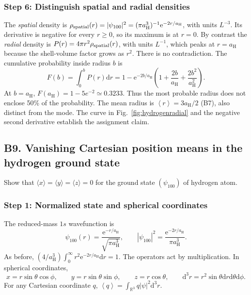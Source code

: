 \documentclass[11pt,a4paper]{article}
\newcommand{\dd}{\mathrm{d}}
\newcommand{\ee}{\mathrm{e}}
\newcommand{\avg}[1]{\left\langle #1\right\rangle}
\newcommand{\R}{\mathbb R}
\newcommand{\aH}{a_{\mathrm H}}
\begin{document}
\subsubsection*{Step 6: Distinguish spatial and radial densities}
The \emph{spatial} density is \(\rho_{\rm spatial}(r)=|\psi_{100}|^2=(\pi\aH^3)^{-1}\ee^{-2r/\aH}\), with units \(L^{-3}\). Its derivative is negative for every \(r\ge0\), so its maximum is at \(r=0\). By contrast the \emph{radial} density is \(P(r)=4\pi r^2\rho_{\rm spatial}(r)\), with units \(L^{-1}\), which peaks at \(r=\aH\) because the shell-volume factor grows as \(r^2\). There is no contradiction. The cumulative probability inside radius \(b\) is
\begin{equation}\boxed{F(b)=\int_0^bP(r)\dd r=1-\ee^{-2b/\aH}\left(1+\frac{2b}{\aH}+\frac{2b^2}{\aH^2}\right).}\end{equation}
At \(b=\aH\), \(F(\aH)=1-5e^{-2}\simeq0.3233\). Thus the most probable radius does not enclose 50\% of the probability. The mean radius is \(\avg r=3\aH/2\) (B7), also distinct from the mode. The curve in Fig.~\ref{fig:hydrogenradial} and the negative second derivative establish the assignment claim.

\subsection{B9. Vanishing Cartesian position means in the hydrogen ground state}
\begin{questionbox}Show that \(\langle x\rangle=\langle y\rangle=\langle z\rangle=0\) for the ground state \((\psi_{100})\) of hydrogen atom.\end{questionbox}
\subsubsection*{Step 1: Normalized state and spherical coordinates}
The reduced-mass \(1s\) wavefunction is
\begin{equation}\psi_{100}(r)=\frac{\ee^{-r/\aH}}{\sqrt{\pi\aH^3}},\qquad |\psi_{100}|^2=\frac{\ee^{-2r/\aH}}{\pi\aH^3}.\end{equation}
As before, \((4/\aH^3)\int_0^\infty r^2\ee^{-2r/\aH}\dd r=1\). The operators act by multiplication. In spherical coordinates,
\begin{equation}x=r\sin\theta\cos\phi,\qquad y=r\sin\theta\sin\phi,\qquad z=r\cos\theta,\qquad\dd^3r=r^2\sin\theta\dd r\dd\theta\dd\phi.\end{equation}
For any Cartesian coordinate \(q\), \(\avg q=\int_{\R^3}q|\psi|^2\dd^3r\).
\end{document}
